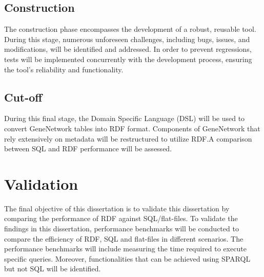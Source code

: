 \subsection{Construction}

The construction phase encompasses the development of a robust, reusable tool.  During this stage, numerous unforeseen challenges, including bugs, issues, and modifications, will be identified and addressed.  In order to prevent regressions, tests will be implemented concurrently with the development process, ensuring the tool's reliability and functionality.

\subsection{Cut-off}

During this final stage, the Domain Specific Language (DSL) will be used to convert GeneNetwork tables into RDF format.  Components of GeneNetwork that rely extensively on metadata will be restructured to utilize RDF.\@  A comparison between SQL and RDF performance will be assessed.

\section{Validation}

The final objective of this dissertation is to validate this dissertation by comparing the performance of RDF against SQL/flat-files.  To validate the findings in this dissertation, performance benchmarks will be conducted to compare the efficiency of RDF, SQL and flat-files in different scenarios.  The performance benchmarks will include measuring the time required to execute specific queries.  Moreover, functionalities that can be achieved using SPARQL but not SQL will be identified.

